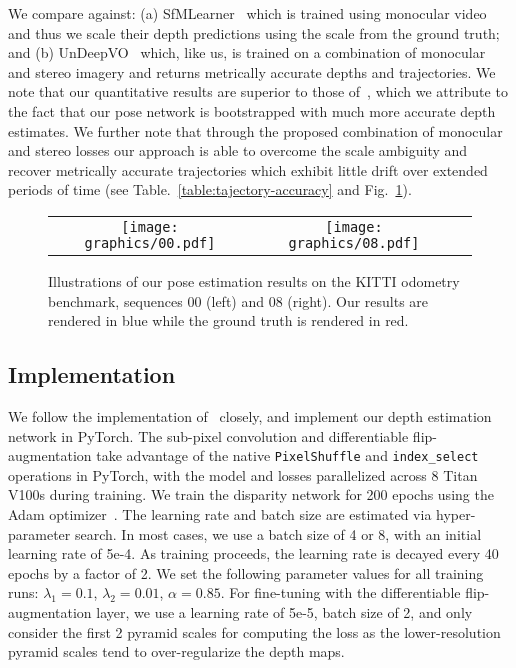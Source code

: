 \documentclass[letterpaper, 10 pt, conference]{ieeeconf}  \IEEEoverridecommandlockouts
\begin{document}
 
We compare against: (a) SfMLearner~\cite{zhou2017unsupervised} which is trained using monocular video and thus we scale their depth predictions using the scale from the ground truth; and (b) UnDeepVO~\cite{li2017undeepvo} which, like us, is trained on a combination of monocular and stereo imagery and returns metrically accurate depths and trajectories. We note that our quantitative results are superior to those of~\cite{li2017undeepvo}, which we attribute to the fact that our pose network is bootstrapped with much more accurate depth estimates. We further note that through the proposed combination of monocular and stereo losses our approach is able to overcome the scale ambiguity and recover metrically accurate trajectories which exhibit little drift over extended periods of time (see Table.~\ref{table:tajectory-accuracy} and Fig.~\ref{fig:trajectory-illustration}).



\begin{figure}[t]
  \centering
  {\renewcommand{\arraystretch}{0.4} {\setlength{\tabcolsep}{0.2mm}
    \begin{tabular}{ccc}
    \texttt{[image: graphics/00.pdf]}&
    \texttt{[image: graphics/08.pdf]}&
\end{tabular}}}
  \caption{Illustrations of our pose estimation results on the KITTI odometry benchmark, sequences 00 (left) and 08 (right). Our results are rendered in blue while the ground truth is rendered in red.}
  \label{fig:trajectory-illustration}
\end{figure}





\subsection{Implementation}
We follow the implementation of~\cite{godard2017unsupervised} closely, and implement our depth estimation network in PyTorch. The sub-pixel convolution and differentiable flip-augmentation take advantage of the native \texttt{PixelShuffle} and \texttt{index\_select} operations in PyTorch, with the model and losses parallelized across 8 Titan V100s during training. We train the disparity network for 200 epochs using the Adam optimizer~\cite{kingma2014adam}. The learning rate and batch size are estimated via hyper-parameter search. In most cases, we use a batch size of 4 or 8, with an initial learning rate of 5e-4. As training proceeds, the learning rate is decayed every 40 epochs by a factor of 2. We set the following parameter values for all training runs: $\lambda_1=0.1$, $\lambda_2=0.01$, $\alpha=0.85$. For fine-tuning with the differentiable flip-augmentation layer, we use a learning rate of 5e-5, batch size of 2, and only consider the first 2 pyramid scales for computing the loss as the lower-resolution pyramid scales tend to over-regularize the depth maps.  
\end{document}
